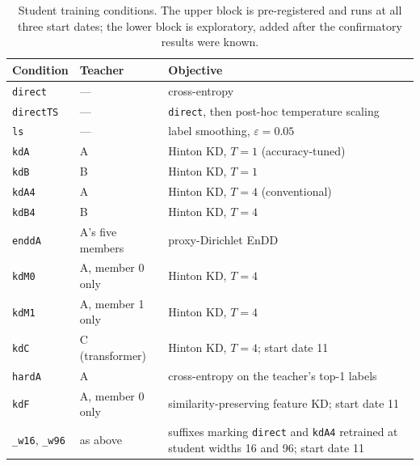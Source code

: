 \documentclass[journal]{IEEEtran}
\newcommand{\kd}[1]{\texttt{#1}}
\begin{document}
\begin{table}[t]
\centering
\caption{Student training conditions. The upper block is pre-registered and runs at all three start dates; the lower block is exploratory, added after the confirmatory results were known.}
\label{tab:conditions}
\footnotesize
\setlength{\tabcolsep}{4pt}
\begin{tabular}{@{}llp{38mm}@{}}
\toprule
Condition & Teacher & Objective \\
\midrule
\kd{direct}   & ---              & cross-entropy \\
\kd{directTS} & ---              & \kd{direct}, then post-hoc temperature scaling \\
\kd{ls}       & ---              & label smoothing, $\varepsilon = 0.05$ \\
\kd{kdA}      & A                & Hinton KD, $T=1$ (accuracy-tuned) \\
\kd{kdB}      & B                & Hinton KD, $T=1$ \\
\kd{kdA4}     & A                & Hinton KD, $T=4$ (conventional) \\
\kd{kdB4}     & B                & Hinton KD, $T=4$ \\
\kd{enddA}    & A's five members & proxy-Dirichlet EnDD \\
\midrule
\kd{kdM0}     & A, member 0 only & Hinton KD, $T=4$ \\
\kd{kdM1}     & A, member 1 only & Hinton KD, $T=4$ \\
\kd{kdC}      & C (transformer)  & Hinton KD, $T=4$; start date 11 \\
\kd{hardA}    & A                & cross-entropy on the teacher's top-1 labels \\
\kd{kdF}      & A, member 0 only & similarity-preserving feature KD; start date 11 \\
\kd{\_w16}, \kd{\_w96} & as above & suffixes marking \kd{direct} and \kd{kdA4} retrained at student widths 16 and 96; start date 11 \\
\bottomrule
\end{tabular}
\end{table}
\end{document}
